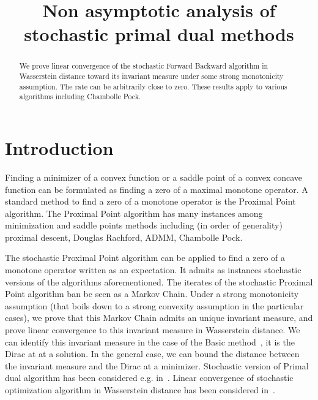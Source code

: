 \documentclass{article}
\title{Non asymptotic analysis of stochastic primal dual methods}
\newcommand{\1}{\mathbbm 1}
\theoremstyle{definition}
\begin{document}
%
\maketitle
%



\begin{abstract} 
We prove linear convergence of the stochastic Forward Backward algorithm in Wasserstein distance toward its invariant measure under some strong monotonicity assumption. The rate can be arbitrarily close to zero. These results apply to various algorithms including Chambolle Pock.
\end{abstract}

%
%

\section{Introduction}
Finding a minimizer of a convex function or a saddle point of a convex concave function can be formulated as finding a zero of a maximal monotone operator. A standard method to find a zero of a monotone operator is the Proximal Point algorithm. The Proximal Point algorithm has many instances among minimization and saddle points methods including (in order of generality) proximal descent, Douglas Rachford, ADMM, Chambolle Pock.

The stochastic Proximal Point algorithm can be applied to find a zero of a monotone operator written as an expectation. It admits as instances stochastic versions of the algorithms aforementioned. The iterates of the stochastic Proximal Point algorithm ban be seen as a Markov Chain. Under a strong monotonicity assumption (that boils down to a strong convexity assumption in the particular cases), we prove that this Markov Chain admits an unique invariant measure, and prove linear convergence to this invariant measure in Wasserstein distance. We can identify this invariant measure in the case of the Basic method~\cite{richtarik2017stochastic}, it is the Dirac at at a solution. In the general case, we can bound the distance between the invariant measure and the Dirac at a minimizer. 
Stochastic version of Primal dual algorithm has been considered e.g. in~\cite{chambolle2018stochastic}. Linear convergence of stochastic optimization algorithm in Wasserstein distance has been considered in~\cite{dieuleveut2017bridging,can2019accelerated}. 
\end{document}

